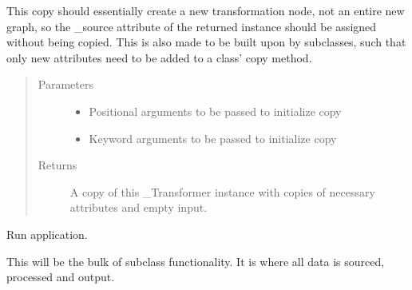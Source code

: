 \documentclass[letterpaper,10pt,english]{sphinxmanual}
\begin{document}
\begin{fulllineitems}
\begin{fulllineitems}
This copy should essentially create a new transformation node, not an
entire new graph, so the \_source attribute of the returned instance
should be assigned without being copied. This is also made to be built
upon by subclasses, such that only new attributes need to be added to
a class’ copy method.
\begin{quote}\begin{description}
\item[{Parameters}] \leavevmode\begin{itemize}
\item {} 
 \textendash{} Positional arguments to be passed to initialize copy

\item {} 
 \textendash{} Keyword arguments to be passed to initialize copy

\end{itemize}

\item[{Returns}] \leavevmode
A copy of this \_Transformer instance with copies of necessary
attributes and empty input.

\end{description}\end{quote}

\end{fulllineitems}


\begin{fulllineitems}
\label{\detokenize{dalio.application:dalio.application.application.Application.run}}
Run application.

This will be the bulk of subclass functionality. It is where all
data is sourced, processed and output.

\end{fulllineitems}



\end{fulllineitems}
\end{document}
